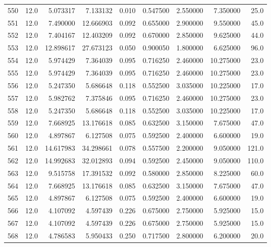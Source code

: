 \begin{tabular}{lrrrrrrrr}
550  &   12.0 &   5.073317 &   7.133132 &  0.010 &  0.547500 &  2.550000 &   7.350000 &   25.0 \\
551  &   12.0 &   7.490000 &  12.666903 &  0.092 &  0.655000 &  2.900000 &   9.550000 &   45.0 \\
552  &   12.0 &   7.404167 &  12.403209 &  0.092 &  0.670000 &  2.850000 &   9.625000 &   44.0 \\
553  &   12.0 &  12.898617 &  27.673123 &  0.050 &  0.900050 &  1.800000 &   6.625000 &   96.0 \\
554  &   12.0 &   5.974429 &   7.364039 &  0.095 &  0.716250 &  2.460000 &  10.275000 &   23.0 \\
555  &   12.0 &   5.974429 &   7.364039 &  0.095 &  0.716250 &  2.460000 &  10.275000 &   23.0 \\
556  &   12.0 &   5.247350 &   5.686648 &  0.118 &  0.552500 &  3.035000 &  10.225000 &   17.0 \\
557  &   12.0 &   5.982762 &   7.375846 &  0.095 &  0.716250 &  2.460000 &  10.275000 &   23.0 \\
558  &   12.0 &   5.247350 &   5.686648 &  0.118 &  0.552500 &  3.035000 &  10.225000 &   17.0 \\
559  &   12.0 &   7.668925 &  13.176618 &  0.085 &  0.632500 &  3.150000 &   7.675000 &   47.0 \\
560  &   12.0 &   4.897867 &   6.127508 &  0.075 &  0.592500 &  2.400000 &   6.600000 &   19.0 \\
561  &   12.0 &  14.617983 &  34.298661 &  0.078 &  0.557500 &  2.200000 &   9.050000 &  121.0 \\
562  &   12.0 &  14.992683 &  32.012893 &  0.094 &  0.592500 &  2.450000 &   9.050000 &  110.0 \\
563  &   12.0 &   9.515758 &  17.391532 &  0.092 &  0.580000 &  2.850000 &   8.225000 &   60.0 \\
564  &   12.0 &   7.668925 &  13.176618 &  0.085 &  0.632500 &  3.150000 &   7.675000 &   47.0 \\
565  &   12.0 &   4.897867 &   6.127508 &  0.075 &  0.592500 &  2.400000 &   6.600000 &   19.0 \\
566  &   12.0 &   4.107092 &   4.597439 &  0.226 &  0.675000 &  2.750000 &   5.925000 &   15.0 \\
567  &   12.0 &   4.107092 &   4.597439 &  0.226 &  0.675000 &  2.750000 &   5.925000 &   15.0 \\
568  &   12.0 &   4.786583 &   5.950433 &  0.250 &  0.717500 &  2.800000 &   6.200000 &   20.0 \\

\end{tabular}
